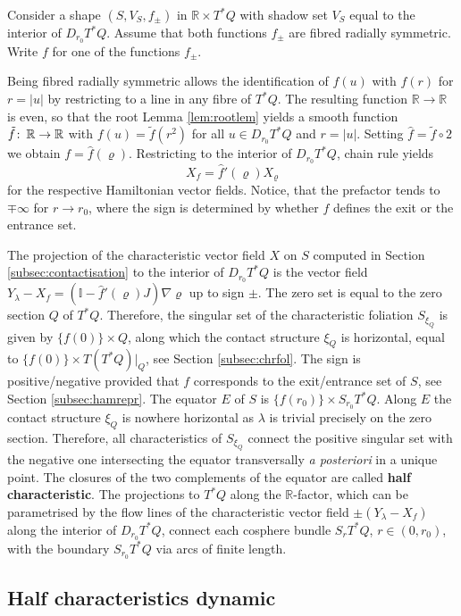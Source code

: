 \documentclass{amsart}
\theoremstyle{definition}
\def\co{\colon\thinspace}
\newcommand{\R}{\mathbb R}
\newcommand{\ra}{\rightarrow}
\begin{document}
Consider a shape $(S,V_S,f_{\pm})$ in $\R\times T^*Q$
with shadow set $V_S$ equal to the interior of $D_{r_0}T^*Q$.
Assume that both functions $f_{\pm}$ are fibred radially symmetric.
Write $f$ for one of the functions $f_{\pm}$.

Being fibred radially symmetric
allows the identification of $f(u)$ with $f(r)$ for $r=|u|$
by restricting to a line in any fibre of $T^*Q$.
The resulting function $\R\ra\R$ is even,
so that the root Lemma \ref{lem:rootlem} yields
a smooth function $\tilde{f}\co\R\ra\R$
with $f(u)=\tilde{f}(r^2)$ for all $u\in D_{r_0}T^*Q$
and $r=|u|$.
Setting $\hat{f}=\tilde{f}\circ2$ we obtain $f=\hat{f}(\varrho)$.
Restricting to the interior of $D_{r_0}T^*Q$,
chain rule yields
\[
X_f=
\hat{f}'(\varrho)X_{\varrho}
\]
for the respective Hamiltonian vector fields.
Notice, that the prefactor tends to $\mp\infty$ for $r\ra r_0$,
where the sign is determined by
whether $f$ defines the exit or the entrance set.

The projection of the characteristic vector field $X$ on $S$
computed in Section \ref{subsec:contactisation}
to the interior of $D_{r_0}T^*Q$
is the vector field
$Y_{\lambda}-X_f=(\mathbb{I}-\hat{f}'(\varrho)J)\nabla\!\varrho$
up to sign $\pm$.
The zero set is equal to the zero section $Q$ of $T^*Q$.
Therefore,
the singular set of the characteristic foliation $S_{\xi_Q}$
is given by $\{f(0)\}\times Q$,
along which the contact structure $\xi_Q$
is horizontal, equal to $\{f(0)\}\times T(T^*Q)|_Q$,
see Section \ref{subsec:chrfol}.
The sign is positive/negative provided that $f$ corresponds to 
the exit/entrance set of $S$,
see Section \ref{subsec:hamrepr}.
The equator $E$ of $S$ is $\{f(r_0)\}\times S_{r_0}T^*Q$.
Along $E$ the contact structure $\xi_Q$ is nowhere horizontal
as $\lambda$ is trivial precisely on the zero section.
Therefore,
all characteristics of $S_{\xi_Q}$
connect the positive singular set with the negative one
intersecting the equator transversally
{\it a posteriori} in a unique point.
The closures of the two complements of the equator
are called {\bf half characteristic}. 
The projections to $T^*Q$ along the $\R$-factor,
which can be parametrised by the flow lines
of the characteristic vector field $\pm(Y_{\lambda}-X_f)$
along the interior of $D_{r_0}T^*Q$,
connect each cosphere bundle $S_rT^*Q$, $r\in(0,r_0)$,
with the boundary $S_{r_0}T^*Q$
via arcs of finite length.



\subsection{Half characteristics dynamic\label{subsec:halfchardyn}}
\end{document}
